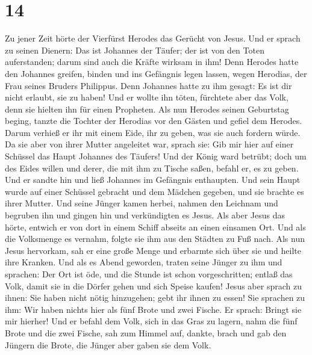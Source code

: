 \hypertarget{section-13}{%
\section{14}\label{section-13}}

 Zu jener Zeit hörte der Vierfürst Herodes das Gerücht von
Jesus.  Und er sprach zu seinen Dienern: Das ist Johannes
der Täufer; der ist von den Toten auferstanden; darum sind auch die
Kräfte wirksam in ihm!  Denn Herodes hatte den Johannes
greifen, binden und ins Gefängnis legen lassen, wegen Herodias, der Frau
seines Bruders Philippus.  Denn Johannes hatte zu ihm
gesagt: Es ist dir nicht erlaubt, sie zu haben!  Und er
wollte ihn töten, fürchtete aber das Volk, denn sie hielten ihn für
einen Propheten.  Als nun Herodes seinen Geburtstag
beging, tanzte die Tochter der Herodias vor den Gästen und gefiel dem
Herodes.  Darum verhieß er ihr mit einem Eide, ihr zu
geben, was sie auch fordern würde.  Da sie aber von ihrer
Mutter angeleitet war, sprach sie: Gib mir hier auf einer Schüssel das
Haupt Johannes des Täufers!  Und der König ward betrübt;
doch um des Eides willen und derer, die mit ihm zu Tische saßen, befahl
er, es zu geben.  Und er sandte hin und ließ Johannes im
Gefängnis enthaupten.  Und sein Haupt wurde auf einer
Schüssel gebracht und dem Mädchen gegeben, und sie brachte es ihrer
Mutter.  Und seine Jünger kamen herbei, nahmen den
Leichnam und begruben ihn und gingen hin und verkündigten es Jesus.
 Als aber Jesus das hörte, entwich er von dort in einem
Schiff abseits an einen einsamen Ort. Und als die Volksmenge es vernahm,
folgte sie ihm aus den Städten zu Fuß nach.  Als nun
Jesus hervorkam, sah er eine große Menge und erbarmte sich über sie und
heilte ihre Kranken.  Und als es Abend geworden, traten
seine Jünger zu ihm und sprachen: Der Ort ist öde, und die Stunde ist
schon vorgeschritten; entlaß das Volk, damit sie in die Dörfer gehen und
sich Speise kaufen!  Jesus aber sprach zu ihnen: Sie
haben nicht nötig hinzugehen; gebt ihr ihnen zu essen! 
Sie sprachen zu ihm: Wir haben nichts hier als fünf Brote und zwei
Fische.  Er sprach: Bringt sie mir hierher!
 Und er befahl dem Volk, sich in das Gras zu lagern, nahm
die fünf Brote und die zwei Fische, sah zum Himmel auf, dankte, brach
und gab den Jüngern die Brote, die Jünger aber gaben sie dem Volk.
